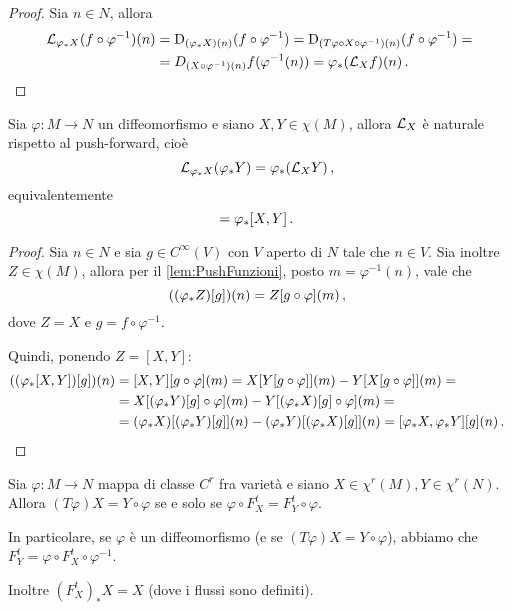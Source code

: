 \begin{proof}
	Sia $n\in N$, allora
	\begin{align*}
		\mathcal L_{\varphi_*X}(f\circ \varphi^{-1})(n)&=\mathrm D_{(\varphi_*X)(n)}(f\circ \varphi^{-1})=\mathrm D_{(T\varphi \circ X \circ\varphi^{-1})(n)}(f\circ \varphi^{-1})=\\
		&=D_{(X\circ \varphi^{-1})(n)} f(\varphi^{-1}(n))=\varphi_*(\mathcal L_Xf)(n)\, \text{. }
	\end{align*}
\end{proof}


\begin{proposition}
	Sia $\varphi:M\to N$ un diffeomorfismo e siano $X,Y\in\chi(M)$, allora $\mathcal L_X$ è naturale rispetto al push-forward, cioè
	\begin{equation*}
		\mathcal L_{\varphi_*X}(\varphi_*Y)=\varphi_*(\mathcal L_XY)\, \text{, }
	\end{equation*}
	equivalentemente
	\begin{equation*}
		[\varphi_*X,\varphi_*Y]=\varphi_*[X,Y]\punto
	\end{equation*}
\end{proposition}

\begin{proof}
	Sia $n\in N$ e sia $g\in C^\infty(V)$ con $V$ aperto di $N$ tale che $n\in V$. Sia inoltre $Z\in\chi(M)$, allora per il \cref{lem:PushFunzioni}, posto $m=\varphi^{-1}(n)$, vale che
	\begin{equation*}
		((\varphi_*Z)[g])(n)=Z[g\circ \varphi](m)\, \text{, }
	\end{equation*}
	dove $Z=X$ e $g=f\circ \varphi^{-1}$.
	
	Quindi, ponendo $Z=[X,Y]$:
	\begin{align*}
	((\varphi_*[X,Y])[g])(n)&=[X,Y][g\circ \varphi](m)=X[Y[g\circ \varphi]](m)-Y[X[g\circ \varphi]](m)=\\
	&=X[(\varphi_*Y)[g]\circ \varphi](m)-Y[(\varphi_*X)[g]\circ \varphi](m) =\\
	&= (\varphi_*X)[(\varphi_*Y)[g]](n)-(\varphi_*Y)[(\varphi_*X)[g]](n) = [\varphi_* X, \varphi_* Y][g](n)\, \text{. }
	\end{align*}
\end{proof}

\begin{lemma} \label{lemma:FlussiEMappe}
	Sia $\varphi:M\to N$ mappa di classe $C^r$ fra varietà e siano $X\in\chi^r(M),Y\in\chi^r(N)$. Allora $(T\varphi)X=Y\circ \varphi$ se e solo se $\varphi\circ F_X^t=F_Y^t\circ\varphi$.
	
	In particolare, se $\varphi$ è un diffeomorfismo (e se $(T\varphi)X=Y\circ \varphi$), abbiamo che \\
	$F_Y^t=\varphi\circ F_X^t\circ \varphi^{-1}$.
	
	Inoltre $(F_X^t)_*X=X$ (dove i flussi sono definiti).
\end{lemma}

